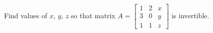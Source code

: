 Find values of $x$, $y$, $z$ so that matrix
$A =
\begin{bmatrix}
1 & 2 & x\\
3 & 0 & y \\
1 & 1 & z
\end{bmatrix}$
is invertible.